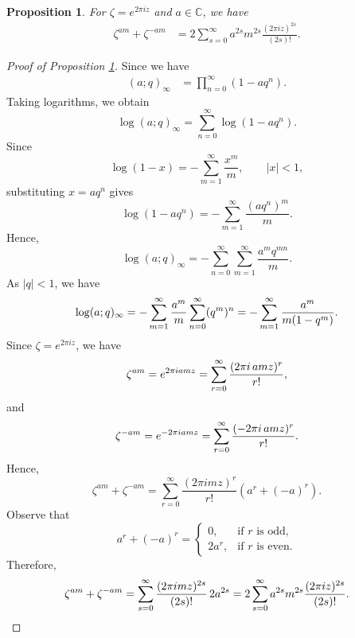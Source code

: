 \documentclass[12pt,oneside,reqno]{amsart}
\numberwithin{equation}{section}
\newtheorem{prop}{Proposition}
\begin{document}
\begin{prop}\label{prop1} For $\zeta=e^{2\pi iz}$ and $ a\in \mathbb{C}$, we have
	\begin{align}
		\zeta^{am}+\zeta^{-am}
		&=
		2\sum_{s=0}^{\infty}
		a^{2s}m^{2s}
		\frac{(2\pi iz)^{2s}}{(2s)!}.
	\end{align} 
\end{prop}
\begin{proof}[Proof of Proposition \ref{prop1}]
	Since we have
	\begin{align*}
		(a;q)_\infty
		&=
		\prod_{n=0}^{\infty}(1-aq^n).
	\end{align*}
	Taking logarithms, we obtain
	\begin{equation}\label{p1}
		\log (a;q)_\infty
		=
		\sum_{n=0}^{\infty}\log(1-aq^n).
	\end{equation}
	Since
	\begin{equation}\label{p2}
		\log(1-x)
		=
		-\sum_{m=1}^{\infty}\frac{x^m}{m},
		\qquad |x|<1,
	\end{equation}
	substituting $x=aq^n$ gives
	\begin{equation}\label{p3}
		\log(1-aq^n)
		=
		-\sum_{m=1}^{\infty}\frac{(aq^n)^m}{m}.
	\end{equation}
	Hence,
	\begin{equation}\label{p4}
		\log(a;q)_\infty
		=
		-\sum_{n=0}^{\infty}\sum_{m=1}^{\infty}
		\frac{a^m q^{mn}}{m}.
	\end{equation}
	As $|q|<1$, we have
	\begin{equation}\label{p5}
		\log(a;q)_\infty
		=
		-\sum_{m=1}^{\infty}\frac{a^m}{m}
		\sum_{n=0}^{\infty}(q^m)^n \\
		=
		-\sum_{m=1}^{\infty}
		\frac{a^m}{m(1-q^m)}.
	\end{equation}
	Since $\zeta=e^{2\pi iz}$, we have
	\begin{equation}\label{p6}
		\zeta^{am}
		=e^{2\pi iamz}\\
		=\sum_{r=0}^{\infty}
		\frac{(2\pi i\,amz)^r}{r!},
	\end{equation}
	and
	\begin{equation}\label{p7}
		\zeta^{-am}
		=e^{-2\pi iamz}\\
		=\sum_{r=0}^{\infty}
		\frac{(-2\pi i\,amz)^r}{r!}.
	\end{equation}
	Hence,
	\begin{equation}\label{p8}
		\zeta^{am}+\zeta^{-am}
		=
		\sum_{r=0}^{\infty}
		\frac{(2\pi i mz)^r}{r!}
		\left(a^r+(-a)^r\right).
	\end{equation}
	Observe that
	\[
	a^r+(-a)^r=
	\begin{cases}
		0, & \text{if } r \text{ is odd},\\[2mm]
		2a^r, & \text{if } r \text{ is even}.
	\end{cases}
	\]
	Therefore,
	\begin{equation}
		\zeta^{am}+\zeta^{-am}
		=
		\sum_{s=0}^{\infty}
		\frac{(2\pi i mz)^{2s}}{(2s)!}\,2a^{2s}\\
		=
		2\sum_{s=0}^{\infty}
		a^{2s}m^{2s}
		\frac{(2\pi iz)^{2s}}{(2s)!}.
		\label{eq:9}
	\end{equation} 
\end{proof}
\end{document}
